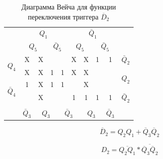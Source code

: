\documentclass[a4paper,14pt]{article}
\begin{document}
\begin{table}[H]
	\begin{center}
		\caption{\label{tab:unD2_tab} Диаграмма Вейча для функции переключения триггера $\overline{D}_2$ }
	\begin{tabular}{cccccccccc}
		& \multicolumn{4}{c}{$Q_1$} & \multicolumn{4}{c}{$\bar{Q}_1$} &  \\
		& \multicolumn{2}{c}{$Q_5$} & \multicolumn{2}{c}{$\bar{Q}_5$} & \multicolumn{2}{c}{$Q_5$} & \multicolumn{2}{c}{$\bar{Q}_5$} &  \\ \cline{2-9}
		\multicolumn{1}{c|}{\multirow{2}{*}{$Q_4$}} & \multicolumn{1}{c|}{X} & \multicolumn{1}{c|}{X} & \multicolumn{1}{c|}{} & \multicolumn{1}{c|}{} & \multicolumn{1}{c|}{X} & \multicolumn{1}{c|}{X} & \multicolumn{1}{c|}{1} & \multicolumn{1}{c|}{1} & $\bar{Q}_2$ \\ \cline{2-9}
		\multicolumn{1}{c|}{} & \multicolumn{1}{c|}{X} & \multicolumn{1}{c|}{X} & \multicolumn{1}{c|}{1} & \multicolumn{1}{c|}{1} & \multicolumn{1}{c|}{X} & \multicolumn{1}{c|}{X} & \multicolumn{1}{c|}{} & \multicolumn{1}{c|}{} & \multirow{2}{*}{$Q_2$} \\ \cline{2-9}
		\multicolumn{1}{c|}{\multirow{2}{*}{$\bar{Q}_4$}} & \multicolumn{1}{c|}{1} & \multicolumn{1}{c|}{X} & \multicolumn{1}{c|}{1} & \multicolumn{1}{c|}{1} & \multicolumn{1}{c|}{} & \multicolumn{1}{c|}{X} & \multicolumn{1}{c|}{} & \multicolumn{1}{c|}{} &  \\ \cline{2-9}
		\multicolumn{1}{c|}{} & \multicolumn{1}{c|}{} & \multicolumn{1}{c|}{X} & \multicolumn{1}{c|}{} & \multicolumn{1}{c|}{} & \multicolumn{1}{c|}{1} & \multicolumn{1}{c|}{1} & \multicolumn{1}{c|}{1} & \multicolumn{1}{c|}{1} & $\bar{Q}_2$ \\ \cline{2-9}
		&  & \multicolumn{2}{c}{} & \multicolumn{2}{c}{} & \multicolumn{2}{c}{} &  &  \\
		& $\bar{Q}_3$ & \multicolumn{2}{c}{$Q_3$} & \multicolumn{2}{c}{$\bar{Q}_3$} & \multicolumn{2}{c}{$Q_3$} & $\bar{Q}_3$ & 
	\end{tabular}
	\end{center}
\end{table}

$$\overline{D}_2 = Q_2Q_1 + \overline{Q}_3\overline{Q}_2$$

$$D_2 = \overline{Q_2Q_1} * \overline{\overline{Q}_3\overline{Q}_2}$$

\end{document}
